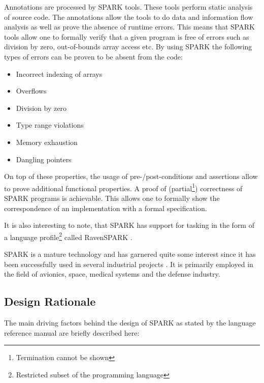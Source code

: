 Annotations are processed by SPARK tools. These tools perform static analysis of
source code. The annotations allow the tools to do data and information flow
analysis as well as prove the absence of runtime errors. This means that SPARK
tools allow one to formally verify that a given program is free of errors such
as division by zero, out-of-bounds array access etc. By using SPARK the
following types of errors can be proven to be absent from the code:

\begin{itemize}
	\item Incorrect indexing of arrays
	\item Overflows
	\item Division by zero
	\item Type range violations
	\item Memory exhaustion
	\item Dangling pointers
\end{itemize}

On top of these properties, the usage of pre-/post-conditions and assertions
allow to prove additional functional properties. A proof of
(partial\footnote{Termination cannot be shown}) correctness of SPARK programs is
achievable. This allows one to formally show the correspondence of an
implementation with a formal specification.

It is also interesting to note, that SPARK has support for tasking in the form
of a language profile\footnote{Restricted subset of the programming language}
called RavenSPARK \cite{RavenSPARK}.

SPARK is a mature technology and has garnered quite some interest since it has
been successfully used in several industrial projects
\cite{Chapman:2000:IES:369264.369270}. It is primarily employed in the field of
avionics, space, medical systems and the defense industry.

\subsection{Design Rationale}
The main driving factors behind the design of SPARK as stated by the language
reference manual \cite{SPARK} are briefly described here:


